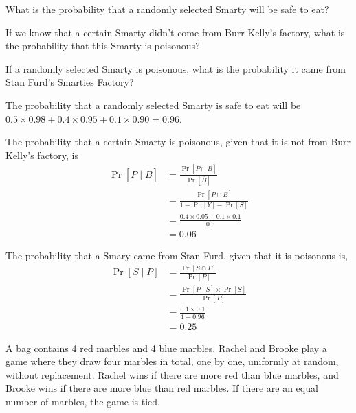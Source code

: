 \documentclass[11pt]{article}
\begin{document}
\begin{Parts}
\Part
What is the probability that a randomly selected Smarty will be safe to eat?

\Part
If we know that a certain Smarty didn't come from Burr Kelly's factory, what is 
the probability that this Smarty is poisonous?

\Part
If a randomly selected Smarty is poisonous, what is the probability it came from 
Stan Furd's Smarties Factory?

\end{Parts}

\begin{solution}
    
\begin{Parts}
    
\Part The probability that a randomly selected Smarty is safe to eat will be 
$0.5 \times 0.98 + 0.4 \times 0.95 + 0.1 \times 0.90 =  0.96$. 

\Part The probability that a certain Smarty is poisonous, given that it is not
from Burr Kelly's factory, is
\[
    \begin{split}
        \Pr[P \mid \overline{B}] &= \frac{\Pr[P \cap \overline{B}]}{\Pr[\overline{B}]} \\
        &= \frac{\Pr[P \cap \overline{B}]}{1 - \Pr[Y] - \Pr[S]} \\
        &= \frac{0.4 \times 0.05 + 0.1 \times 0.1}{0.5} \\
        &= 0.06
    \end{split}
\]

\Part The probability that a Smary came from Stan Furd, given that it is poisonous
is, 
\[
    \begin{split}
        \Pr[S \mid P] &= \frac{\Pr[S \cap P]}{\Pr[P]} \\
        &= \frac{\Pr[P \mid S] \times \Pr[S]}{\Pr[P]} \\
        &= \frac{0.1 \times 0.1}{1 - 0.96} \\
        &= 0.25
    \end{split}
\]

\end{Parts}

\end{solution}


A bag contains 4 red marbles and 4 blue marbles. Rachel and Brooke play a game 
where they draw four marbles in total, one by one, uniformly at random, without 
replacement. Rachel wins if there are more red than blue marbles, and Brooke 
wins if there are more blue than red marbles. If there are an equal number of 
marbles, the game is tied.
\end{document}
